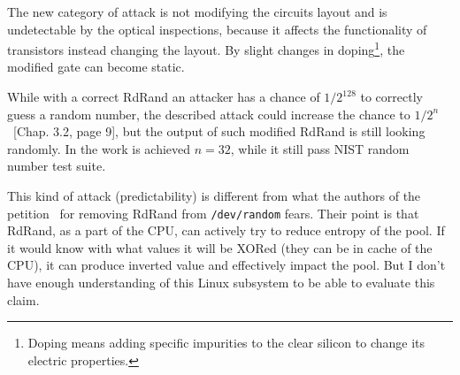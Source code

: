 \par{
The new category of attack is not modifying the circuits layout 
and is undetectable by the optical inspections, because it affects the functionality
 of transistors instead changing the layout. By slight changes 
 in doping\footnote{Doping means adding specific impurities to the clear silicon 
 to change its electric properties.}, the modified gate can become static.
}

\par{
While with a correct RdRand an attacker has a chance of $ 1/2^{128}$ to correctly guess 
a random number, the described attack could increase the chance to 
$ 1/2^n$~\cite{DopantAttack}[Chap. 3.2, page 9], but the output of such
 modified RdRand is still looking randomly. In the work is achieved  
 $n = 32$, while it still pass NIST random number test suite.
}

\par{
This kind of attack (predictability) is different from what the authors of the petition~\cite{PetitionRdRand} for removing RdRand from {\tt /dev/random} fears. Their point is that RdRand, as a part of the CPU, can actively try to reduce entropy of the pool. If it would know with what values it will be XORed (they can be in cache of the CPU), it can produce inverted value and effectively impact the pool. But I don't have enough understanding of this Linux subsystem to be able to evaluate this claim.
}
